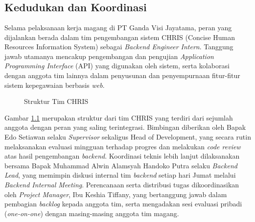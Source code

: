 \chapter{\babTiga}



\section{Kedudukan dan Koordinasi}

Selama pelaksanaan kerja magang di PT Ganda Visi Jayatama, peran yang dijalankan berada dalam tim pengembangan sistem CHRIS (Concise Human Resources Information System) sebagai \textit{Backend Engineer Intern}. Tanggung jawab utamanya mencakup pengembangan dan pengujian \textit{Application Programming Interface} (API) yang digunakan oleh sistem, serta kolaborasi dengan anggota tim lainnya dalam penyusunan dan penyempurnaan fitur-fitur sistem kepegawaian berbasis \textit{web}.

\begin{figure}[H]
    \centering
    \caption{Struktur Tim CHRIS}
    \label{fig:struktur_tim_CHRIS}
\end{figure}

Gambar \ref{fig:struktur_tim_CHRIS} merupakan struktur dari tim CHRIS yang terdiri dari sejumlah anggota dengan peran yang saling terintegrasi. Bimbingan diberikan oleh Bapak Edo Setiawan selaku \textit{Supervisor} sekaligus Head of Development, yang secara rutin melaksanakan evaluasi mingguan terhadap progres dan melakukan \textit{code review} atas hasil pengembangan \textit{backend}. Koordinasi teknis lebih lanjut dilaksanakan bersama Bapak Muhammad Alwin Alamsyah Handoko Putra selaku \textit{Backend Lead}, yang memimpin diskusi internal tim \textit{backend} setiap hari Jumat melalui \textit{Backend Internal Meeting}. Perencanaan serta distribusi tugas dikoordinasikan oleh \textit{Project Manager}, Ibu Keshia Tiffany, yang bertanggung jawab dalam pembagian \textit{backlog} kepada anggota tim, serta mengadakan sesi evaluasi pribadi (\textit{one-on-one}) dengan masing-masing anggota tim magang.

